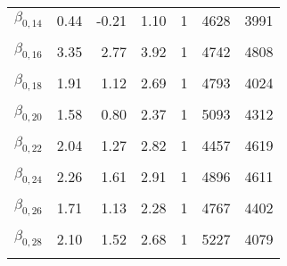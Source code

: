 \begin{table}
\begin{tabular}[t]{lrrrrrr}
$\beta_{0, 14}$ & 0.44 & -0.21 & 1.10 & 1 & 4628 & 3991\\
\cellcolor{gray!6}{$\beta_{0, 15}$} & \cellcolor{gray!6}{3.32} & \cellcolor{gray!6}{2.56} & \cellcolor{gray!6}{4.10} & \cellcolor{gray!6}{1} & \cellcolor{gray!6}{4472} & \cellcolor{gray!6}{4016}\\
$\beta_{0, 16}$ & 3.35 & 2.77 & 3.92 & 1 & 4742 & 4808\\
\cellcolor{gray!6}{$\beta_{0, 17}$} & \cellcolor{gray!6}{1.58} & \cellcolor{gray!6}{0.99} & \cellcolor{gray!6}{2.16} & \cellcolor{gray!6}{1} & \cellcolor{gray!6}{4457} & \cellcolor{gray!6}{4673}\\
$\beta_{0, 18}$ & 1.91 & 1.12 & 2.69 & 1 & 4793 & 4024\\
\cellcolor{gray!6}{$\beta_{0, 19}$} & \cellcolor{gray!6}{1.22} & \cellcolor{gray!6}{0.65} & \cellcolor{gray!6}{1.80} & \cellcolor{gray!6}{1} & \cellcolor{gray!6}{4448} & \cellcolor{gray!6}{3355}\\
$\beta_{0, 20}$ & 1.58 & 0.80 & 2.37 & 1 & 5093 & 4312\\
\cellcolor{gray!6}{$\beta_{0, 21}$} & \cellcolor{gray!6}{4.17} & \cellcolor{gray!6}{3.57} & \cellcolor{gray!6}{4.74} & \cellcolor{gray!6}{1} & \cellcolor{gray!6}{5061} & \cellcolor{gray!6}{4522}\\
$\beta_{0, 22}$ & 2.04 & 1.27 & 2.82 & 1 & 4457 & 4619\\
\cellcolor{gray!6}{$\beta_{0, 23}$} & \cellcolor{gray!6}{1.02} & \cellcolor{gray!6}{0.51} & \cellcolor{gray!6}{1.54} & \cellcolor{gray!6}{1} & \cellcolor{gray!6}{4744} & \cellcolor{gray!6}{3248}\\
$\beta_{0, 24}$ & 2.26 & 1.61 & 2.91 & 1 & 4896 & 4611\\
\cellcolor{gray!6}{$\beta_{0, 25}$} & \cellcolor{gray!6}{2.28} & \cellcolor{gray!6}{1.51} & \cellcolor{gray!6}{3.05} & \cellcolor{gray!6}{1} & \cellcolor{gray!6}{5325} & \cellcolor{gray!6}{4965}\\
$\beta_{0, 26}$ & 1.71 & 1.13 & 2.28 & 1 & 4767 & 4402\\
\cellcolor{gray!6}{$\beta_{0, 27}$} & \cellcolor{gray!6}{2.92} & \cellcolor{gray!6}{2.35} & \cellcolor{gray!6}{3.49} & \cellcolor{gray!6}{1} & \cellcolor{gray!6}{4786} & \cellcolor{gray!6}{3939}\\
$\beta_{0, 28}$ & 2.10 & 1.52 & 2.68 & 1 & 5227 & 4079\\
\cellcolor{gray!6}{$\beta_{0, 29}$} & \cellcolor{gray!6}{3.03} & \cellcolor{gray!6}{2.23} & \cellcolor{gray!6}{3.80} & \cellcolor{gray!6}{1} & \cellcolor{gray!6}{4387} & \cellcolor{gray!6}{3705}\\

\end{tabular}
\end{table}
